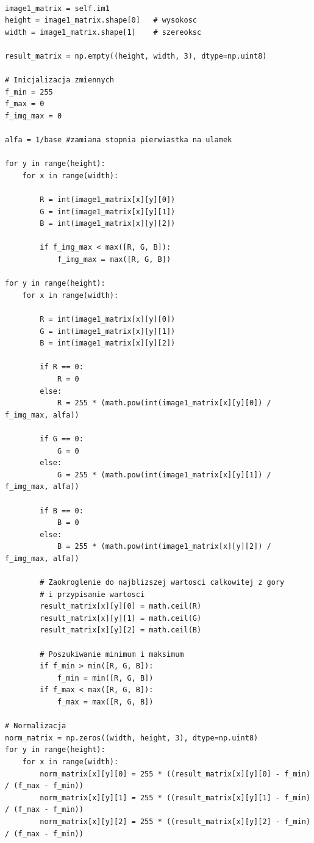 \documentclass[final,a4paper,openany,12pt]{mwbk}
\begin{document}
\begin{lstlisting}[caption= Pierwiastkowanie obrazu barwowego]

image1_matrix = self.im1
height = image1_matrix.shape[0]   # wysokosc
width = image1_matrix.shape[1]    # szereoksc

result_matrix = np.empty((height, width, 3), dtype=np.uint8)

# Inicjalizacja zmiennych
f_min = 255
f_max = 0
f_img_max = 0

alfa = 1/base #zamiana stopnia pierwiastka na ulamek

for y in range(height):
    for x in range(width):  

        R = int(image1_matrix[x][y][0])
        G = int(image1_matrix[x][y][1])
        B = int(image1_matrix[x][y][2])

        if f_img_max < max([R, G, B]):
            f_img_max = max([R, G, B])

for y in range(height):
    for x in range(width):  

        R = int(image1_matrix[x][y][0])
        G = int(image1_matrix[x][y][1])
        B = int(image1_matrix[x][y][2])

        if R == 0:
            R = 0
        else:
            R = 255 * (math.pow(int(image1_matrix[x][y][0]) / f_img_max, alfa))

        if G == 0:
            G = 0
        else:
            G = 255 * (math.pow(int(image1_matrix[x][y][1]) / f_img_max, alfa))
        
        if B == 0:
            B = 0
        else:
            B = 255 * (math.pow(int(image1_matrix[x][y][2]) / f_img_max, alfa))

        # Zaokroglenie do najblizszej wartosci calkowitej z gory
        # i przypisanie wartosci
        result_matrix[x][y][0] = math.ceil(R)
        result_matrix[x][y][1] = math.ceil(G)
        result_matrix[x][y][2] = math.ceil(B)

        # Poszukiwanie minimum i maksimum                
        if f_min > min([R, G, B]):
            f_min = min([R, G, B])
        if f_max < max([R, G, B]):
            f_max = max([R, G, B])

# Normalizacja
norm_matrix = np.zeros((width, height, 3), dtype=np.uint8)
for y in range(height):
    for x in range(width):
        norm_matrix[x][y][0] = 255 * ((result_matrix[x][y][0] - f_min) / (f_max - f_min))
        norm_matrix[x][y][1] = 255 * ((result_matrix[x][y][1] - f_min) / (f_max - f_min))
        norm_matrix[x][y][2] = 255 * ((result_matrix[x][y][2] - f_min) / (f_max - f_min))


\end{lstlisting}
\end{document}
